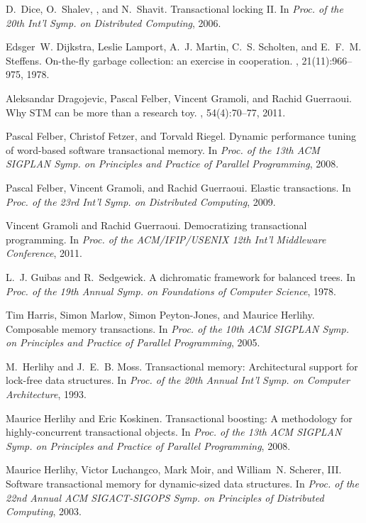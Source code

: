 \begin{thebibliography}{99}
{
D.~Dice, O.~Shalev, , and N.~Shavit.
\newblock Transactional locking {II}.
\newblock In {\em Proc. of the 20th Int'l Symp. on Distributed Computing},
  2006.

Edsger~W. Dijkstra, Leslie Lamport, A.~J. Martin, C.~S. Scholten, and E.~F.~M.
  Steffens.
\newblock On-the-fly garbage collection: an exercise in cooperation.
, 21(11):966--975, 1978.

Aleksandar Dragojevic, Pascal Felber, Vincent Gramoli, and Rachid Guerraoui.
\newblock Why {STM} can be more than a research toy.
, 54(4):70--77, 2011.

Pascal Felber, Christof Fetzer, and Torvald Riegel.
\newblock Dynamic performance tuning of word-based software transactional
  memory.
\newblock In {\em Proc. of the 13th ACM SIGPLAN Symp. on Principles and
  Practice of Parallel Programming}, 2008.

Pascal Felber, Vincent Gramoli, and Rachid Guerraoui.
\newblock Elastic transactions.
\newblock In {\em Proc. of the 23rd Int'l Symp. on Distributed Computing},
  2009.

Vincent Gramoli and Rachid Guerraoui.
\newblock Democratizing transactional programming.
\newblock In {\em Proc. of the ACM/IFIP/USENIX 12th Int'l Middleware
  Conference}, 2011.

L.~J. Guibas and R.~Sedgewick.
\newblock A dichromatic framework for balanced trees.
\newblock In {\em Proc. of the 19th Annual Symp. on Foundations of Computer
  Science}, 1978.

Tim Harris, Simon Marlow, Simon Peyton-Jones, and Maurice Herlihy.
\newblock Composable memory transactions.
\newblock In {\em Proc. of the 10th ACM SIGPLAN Symp. on Principles and
  Practice of Parallel Programming}, 2005.

M.~Herlihy and J.~E.~B. Moss.
\newblock Transactional memory: {Architectural} support for lock-free data
  structures.
\newblock In {\em Proc. of the 20th Annual Int'l Symp. on Computer
  Architecture}, 1993.

Maurice Herlihy and Eric Koskinen.
\newblock Transactional boosting: A methodology for highly-concurrent
  transactional objects.
\newblock In {\em Proc. of the 13th ACM SIGPLAN Symp. on Principles and
  Practice of Parallel Programming}, 2008.

Maurice Herlihy, Victor Luchangco, Mark Moir, and William~N. Scherer, III.
\newblock Software transactional memory for dynamic-sized data structures.
\newblock In {\em Proc. of the 22nd Annual ACM SIGACT-SIGOPS Symp. on
  Principles of Distributed Computing}, 2003.

}
\end{thebibliography}
